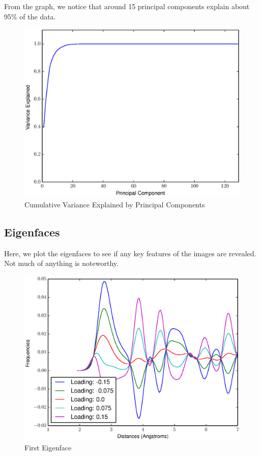 \documentclass[12pt,letterpaper]{article}
\begin{document}
From the graph, we notice that around 15 principal components explain about 95\%
of the data.

\begin{figure}[ht]
  \begin{center}
    \includegraphics[scale=0.8]{figs/eigenfaces_varexplained.eps}
    \caption{Cumulative Variance Explained by Principal Components}
  \end{center}
\end{figure}
\clearpage

\subsection{Eigenfaces}
Here, we plot the eigenfaces to see if any key features of the images are
revealed. Not much of anything is noteworthy.

\begin{figure}[ht]
  \begin{center}
    \includegraphics[scale=0.8]{figs/eigenface1.eps}
    \caption{First Eigenface}
  \end{center}
\end{figure}
\end{document}
